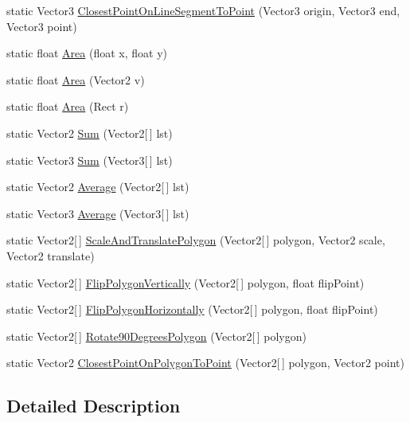 \begin{DoxyCompactItemize}
\item 
static Vector3 \hyperlink{class_math3_d_a97ffc3a67aa0cf3e670783203de5c99d}{Closest\+Point\+On\+Line\+Segment\+To\+Point} (Vector3 origin, Vector3 end, Vector3 point)
\item 
static float \hyperlink{class_math3_d_adf56ad31dd61d2f6956e20d025c5cf52}{Area} (float x, float y)
\item 
static float \hyperlink{class_math3_d_a336f6733ff70acbcc99de7d0d4ab3a13}{Area} (Vector2 v)
\item 
static float \hyperlink{class_math3_d_a98808ef891321d8ba1f25ee18dadf742}{Area} (Rect r)
\item 
static Vector2 \hyperlink{class_math3_d_a5bd71af2fc9fa37411b1632533f54e0d}{Sum} (Vector2\mbox{[}$\,$\mbox{]} lst)
\item 
static Vector3 \hyperlink{class_math3_d_a9a32688a63a8a736555594af34f10140}{Sum} (Vector3\mbox{[}$\,$\mbox{]} lst)
\item 
static Vector2 \hyperlink{class_math3_d_a08392155343d53152bc5a1f4f8d627e1}{Average} (Vector2\mbox{[}$\,$\mbox{]} lst)
\item 
static Vector3 \hyperlink{class_math3_d_a43008afb892cb8283239f815392e7c71}{Average} (Vector3\mbox{[}$\,$\mbox{]} lst)
\item 
static Vector2\mbox{[}$\,$\mbox{]} \hyperlink{class_math3_d_a068f3ade1bb251366427580586ddb076}{Scale\+And\+Translate\+Polygon} (Vector2\mbox{[}$\,$\mbox{]} polygon, Vector2 scale, Vector2 translate)
\item 
static Vector2\mbox{[}$\,$\mbox{]} \hyperlink{class_math3_d_aa748e7194abb2371f5d0f447fb15a842}{Flip\+Polygon\+Vertically} (Vector2\mbox{[}$\,$\mbox{]} polygon, float flip\+Point)
\item 
static Vector2\mbox{[}$\,$\mbox{]} \hyperlink{class_math3_d_a977b39cf721204437aafe67a61352d72}{Flip\+Polygon\+Horizontally} (Vector2\mbox{[}$\,$\mbox{]} polygon, float flip\+Point)
\item 
static Vector2\mbox{[}$\,$\mbox{]} \hyperlink{class_math3_d_aa0b97034e2a49afcb87312415415b5a2}{Rotate90\+Degrees\+Polygon} (Vector2\mbox{[}$\,$\mbox{]} polygon)
\item 
static Vector2 \hyperlink{class_math3_d_a7ef3d389670d7cbc9e79e13854f3b4e8}{Closest\+Point\+On\+Polygon\+To\+Point} (Vector2\mbox{[}$\,$\mbox{]} polygon, Vector2 point)
\end{DoxyCompactItemize}


\subsection{Detailed Description}


